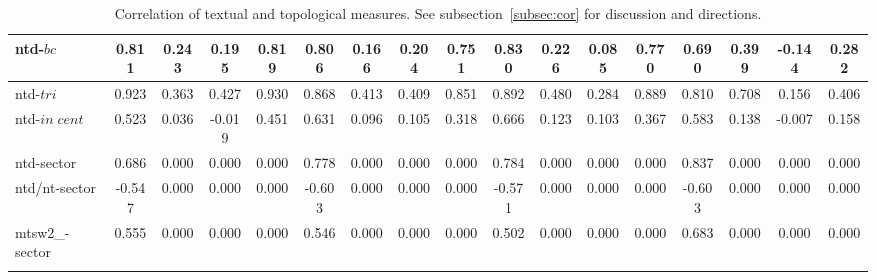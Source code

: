 \documentclass[%
 aip,
 jmp,%
 amsmath,amssymb,
 reprint,%
]{revtex4-1}
\begin{document}
\begin{longtable*}{|p{2cm}|| c|c|c|c|| c|c|c|c|| c|c|c|c|| c|c|c|c|}
ntd-$bc$ & 0.811 & 0.243 & 0.195 & 0.819 & 0.806 & 0.166 & 0.204 & 0.751 & 0.830 & 0.226 & 0.085 & 0.770 & 0.690 & 0.399 & -0.144 & 0.282 \\ \hline
ntd-$tri$ & 0.923 & 0.363 & 0.427 & 0.930 & 0.868 & 0.413 & 0.409 & 0.851 & 0.892 & 0.480 & 0.284 & 0.889 & 0.810 & 0.708 & 0.156 & 0.406 \\ \hline
ntd-$in\;cent$ & 0.523 & 0.036 & -0.019 & 0.451 & 0.631 & 0.096 & 0.105 & 0.318 & 0.666 & 0.123 & 0.103 & 0.367 & 0.583 & 0.138 & -0.007 & 0.158 \\ \hline
ntd-sector & 0.686 & 0.000 & 0.000 & 0.000 & 0.778 & 0.000 & 0.000 & 0.000 & 0.784 & 0.000 & 0.000 & 0.000 & 0.837 & 0.000 & 0.000 & 0.000 \\ \hline
ntd/nt-sector & -0.547 & 0.000 & 0.000 & 0.000 & -0.603 & 0.000 & 0.000 & 0.000 & -0.571 & 0.000 & 0.000 & 0.000 & -0.603 & 0.000 & 0.000 & 0.000 \\ \hline
mtsw2\_-sector & 0.555 & 0.000 & 0.000 & 0.000 & 0.546 & 0.000 & 0.000 & 0.000 & 0.502 & 0.000 & 0.000 & 0.000 & 0.683 & 0.000 & 0.000 & 0.000 \\ \hline
  \caption{Correlation of textual and topological measures. See subsection~\ref{subsec:cor} for discussion and directions.}\label{tab:corTexTop}
\end{longtable*}
\end{document}
